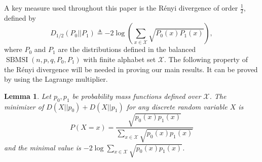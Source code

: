 \documentclass[conference]{IEEEtran}
\newtheorem{lemma}{Lemma}
\DeclareMathOperator{\SBMSI}{SBMSI}
\begin{document}
	A key measure used throughout this paper is the Rényi divergence of order $\frac{1}{2}$, defined by
	\begin{equation}
		D_{1/2}(P_0 || P_1) \triangleq -2\log(\sum_{x \in \mathcal{X}} \sqrt{P_0(x)P_1(x)} ),
	\end{equation}
	where $P_0$ and $P_1$ are the distributions defined in the balanced   $\SBMSI(n,p,q,P_0,P_1)$ with finite alphabet set $\mathcal{X}$.
	The following property of the Rényi divergence will be needed in proving our main results. It can be proved by using the Lagrange multiplier.
	\begin{lemma}\label{lem:p0p12}
		Let $p_0, p_1$ be probability mass functions defined over $\mathcal{X}$. The minimizer
		of $D(X||p_0) + D(X||p_1)$ for any discrete random variable $X$ is
		\begin{equation}\label{eq:p012}
			P(X=x)=\frac{\sqrt{p_0(x)p_1(x)}}{ \sum_{x\in \mathcal{X}} \sqrt{p_0(x) p_1(x)}}
		\end{equation}
		and the minimal value is
		$-2\log \sum_{x\in \mathcal{X}} \sqrt{p_0(x) p_1(x)}$.
	\end{lemma}
\end{document}

